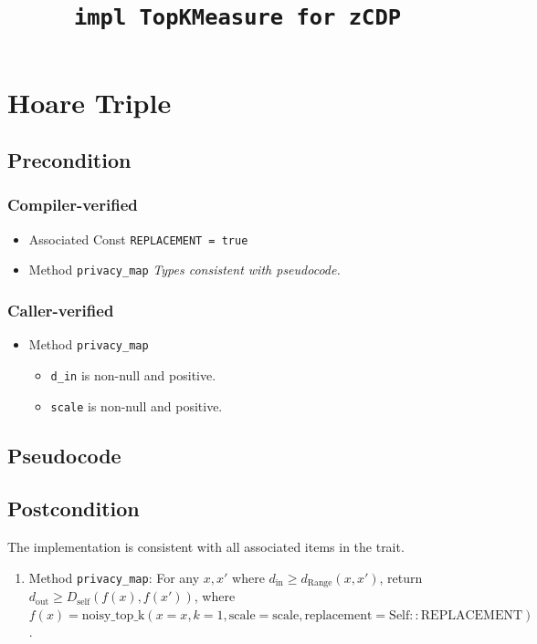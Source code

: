 \documentclass{article}
\title{\texttt{impl TopKMeasure for zCDP}}
\author{\MichaelShoemateAuthor}
\begin{document}
\maketitle

\section{Hoare Triple}
\subsection*{Precondition}
\subsubsection*{Compiler-verified}
\begin{itemize}
    \item Associated Const \texttt{REPLACEMENT = true}
    \item Method \texttt{privacy\_map}
        \textit{Types consistent with pseudocode.}
\end{itemize}

\subsubsection*{Caller-verified}
\begin{itemize}
    \item Method \texttt{privacy\_map}
        \begin{itemize}
            \item \texttt{d\_in} is non-null and positive.
            \item \texttt{scale} is non-null and positive.
        \end{itemize}
\end{itemize}

\subsection*{Pseudocode}
\label{sec:python-pseudocode}


\subsection*{Postcondition}
\begin{theorem}
    The implementation is consistent with all associated items in the  trait.
    \begin{enumerate}
        \item Method \texttt{privacy\_map}:
        For any $x, x'$ where $d_\mathrm{in} \ge d_\mathrm{Range}(x, x')$,
        return $d_\mathrm{out} \ge D_\mathrm{self}(f(x), f(x'))$,
        where $f(x) = \mathrm{noisy\_top\_k}(x=x, k=1, \mathrm{scale}=\mathrm{scale}, \mathrm{replacement}=\mathrm{Self::REPLACEMENT})$.
    \end{enumerate}
\end{theorem}
\end{document}
